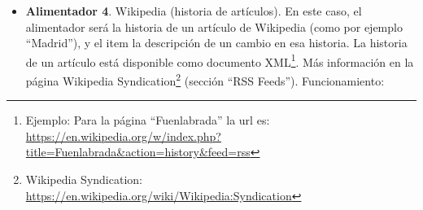 \begin{itemize}
  \begin{itemize}
  \item Alimentador: Etiqueta de Flickr.
  \item Ítem: foto de Flickr.
  \item Elemento HTML para elegir el alimentador: formulario que permita escribir la etiqueta.
  \item Elemento HTML para actualizar el alimentador: botón que actualiza con las fotos de la etiqueta.
  \item Datos mostrados para el alimentador cuando se muestra resumido: etiqueta, enlace a las fotos con esa etiqueta en Flickr\footnote{Por ejemplo, para la etiqueta ``Fuenlabrada'', el enlace sería: \\\url{https://www.flickr.com/search/?tags=fuenlabrada}}, total de items disponibles para este alimentador, puntuación (total de votos positivos menos votos negativos para todos sus items).
  \item Datos mostrados para el alimentador cuando se muestra con detalle: etiqueta, enlace a la página de la etiqueta en Flickr, y lista de fotos para esa etiqueta (con información detallada).
  \item Datos mostrados del ítem (cuando se muestra resumido): título de la foto, enlace a la página de la foto en Flickr.
  \item Datos mostrados del ítem (cuando se muestra con detalle): título de la foto, enlace a la página de la foto en Flickr, foto, etiqueta, enlace a la página de la etiqueta en Flickr.
  \end{itemize}

\item \textbf{Alimentador 4}. Wikipedia (historia de artículos). En este caso, el alimentador será la historia de un artículo de Wikipedia (como por ejemplo ``Madrid''), y el item la descripción de un cambio en esa historia. La historia de un artículo está disponible como documento XML\footnote{Ejemplo: Para la página ``Fuenlabrada'' la url es: \\ \url{https://en.wikipedia.org/w/index.php?title=Fuenlabrada&action=history&feed=rss}}. Más información en la página Wikipedia Syndication\footnote{Wikipedia Syndication: \\ \url{https://en.wikipedia.org/wiki/Wikipedia:Syndication}} (sección ``RSS Feeds''). Funcionamiento:


\end{itemize}
